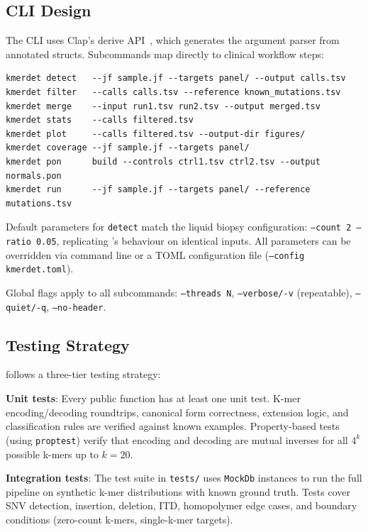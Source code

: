 \subsection{CLI Design}
\label{sec:cli}

The CLI uses Clap's derive API~\cite{clap}, which generates the argument parser
from annotated structs.  Subcommands map directly to clinical workflow steps:

\begin{lstlisting}[style=bash,
  caption={kmerdet subcommand overview.}]
kmerdet detect   --jf sample.jf --targets panel/ --output calls.tsv
kmerdet filter   --calls calls.tsv --reference known_mutations.tsv
kmerdet merge    --input run1.tsv run2.tsv --output merged.tsv
kmerdet stats    --calls filtered.tsv
kmerdet plot     --calls filtered.tsv --output-dir figures/
kmerdet coverage --jf sample.jf --targets panel/
kmerdet pon      build --controls ctrl1.tsv ctrl2.tsv --output normals.pon
kmerdet run      --jf sample.jf --targets panel/ --reference mutations.tsv
\end{lstlisting}

Default parameters for \texttt{detect} match the \km{} liquid biopsy
configuration: \texttt{--count 2 --ratio 0.05}, replicating \km{}'s
behaviour on identical inputs.  All parameters can be overridden via command
line or a TOML configuration file (\texttt{--config kmerdet.toml}).

Global flags apply to all subcommands: \texttt{--threads N},
\texttt{--verbose/-v} (repeatable), \texttt{--quiet/-q}, \texttt{--no-header}.

\subsection{Testing Strategy}
\label{sec:testing}

\kmerdet{} follows a three-tier testing strategy:

\textbf{Unit tests}: Every public function has at least one unit test.
K-mer encoding/decoding roundtrips, canonical form correctness, extension
logic, and classification rules are verified against known examples.
Property-based tests (using \texttt{proptest}) verify that encoding and
decoding are mutual inverses for all $4^k$ possible k-mers up to $k = 20$.

\textbf{Integration tests}: The test suite in \texttt{tests/} uses \texttt{MockDb}
instances to run the full pipeline on synthetic k-mer distributions with
known ground truth.  Tests cover SNV detection, insertion, deletion, ITD,
homopolymer edge cases, and boundary conditions (zero-count k-mers,
single-k-mer targets).

